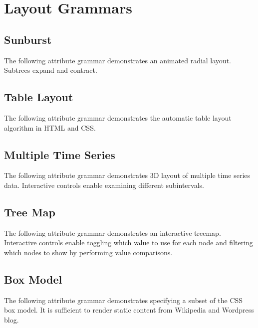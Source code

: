 \chapter{Layout Grammars}


\section{Sunburst}
The following attribute grammar demonstrates an animated radial layout. Subtrees expand and contract.


\section{Table Layout}
The following attribute grammar demonstrates the automatic table layout algorithm in HTML and CSS. 


\section{Multiple Time Series}
The following attribute grammar demonstrates 3D layout of multiple time series data. Interactive controls enable examining different subintervals.


\section{Tree Map}
The following attribute grammar demonstrates an interactive treemap. Interactive controls enable toggling which value to use for each node and filtering which nodes to show by performing value comparisons.


\section{Box Model}
The following attribute grammar demonstrates specifying a subset of the CSS box model. It is sufficient to render static content from Wikipedia and Wordpress blog.
